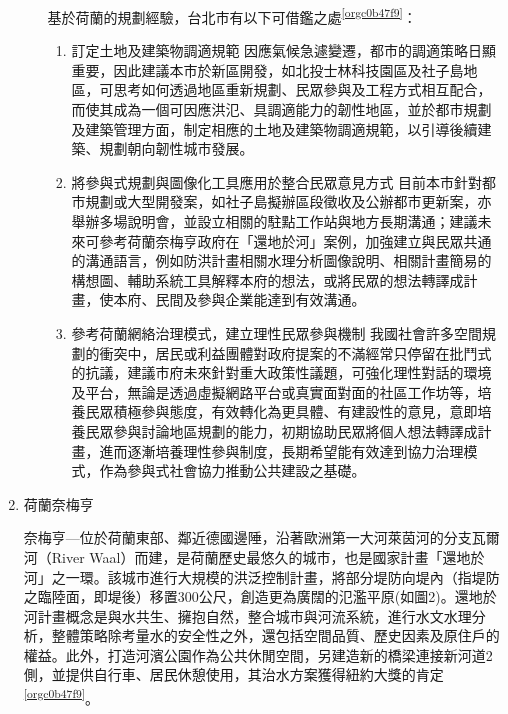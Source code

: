 \documentclass[a4paper,12pt]{article}
\begin{document}
\begin{enumerate}
\begin{enumerate}
基於荷蘭的規劃經驗，台北市有以下可借鑑之處\textsuperscript{\ref{orgc0b47f9}}：\\
\begin{enumerate}
\item 訂定土地及建築物調適規範   因應氣候急遽變遷，都市的調適策略日顯重要，因此建議本市於新區開發，如北投士林科技園區及社子島地區，可思考如何透過地區重新規劃、民眾參與及工程方式相互配合，而使其成為一個可因應洪氾、具調適能力的韌性地區，並於都市規劃及建築管理方面，制定相應的土地及建築物調適規範，以引導後續建築、規劃朝向韌性城市發展。\\
\item 將參與式規劃與圖像化工具應用於整合民眾意見方式   目前本市針對都市規劃或大型開發案，如社子島擬辦區段徵收及公辦都市更新案，亦舉辦多場說明會，並設立相關的駐點工作站與地方長期溝通；建議未來可參考荷蘭奈梅亨政府在「還地於河」案例，加強建立與民眾共通的溝通語言，例如防洪計畫相關水理分析圖像說明、相關計畫簡易的構想圖、輔助系統工具解釋本府的想法，或將民眾的想法轉譯成計畫，使本府、民間及參與企業能達到有效溝通。\\
\item 參考荷蘭網絡治理模式，建立理性民眾參與機制   我國社會許多空間規劃的衝突中，居民或利益團體對政府提案的不滿經常只停留在批鬥式的抗議，建議市府未來針對重大政策性議題，可強化理性對話的環境及平台，無論是透過虛擬網路平台或真實面對面的社區工作坊等，培養民眾積極參與態度，有效轉化為更具體、有建設性的意見，意即培養民眾參與討論地區規劃的能力，初期協助民眾將個人想法轉譯成計畫，進而逐漸培養理性參與制度，長期希望能有效達到協力治理模式，作為參與式社會協力推動公共建設之基礎。\\
\end{enumerate}
\end{enumerate}

\item 荷蘭奈梅亨
\label{sec:org1ce5fc5}

奈梅亨—位於荷蘭東部、鄰近德國邊陲，沿著歐洲第一大河萊茵河的分支瓦爾河（River Waal）而建，是荷蘭歷史最悠久的城市，也是國家計畫「還地於河」之一環。該城市進行大規模的洪泛控制計畫，將部分堤防向堤內（指堤防之臨陸面，即堤後）移置300公尺，創造更為廣闊的氾濫平原(如圖2)。還地於河計畫概念是與水共生、擁抱自然，整合城市與河流系統，進行水文水理分析，整體策略除考量水的安全性之外，還包括空間品質、歷史因素及原住戶的權益。此外，打造河濱公園作為公共休閒空間，另建造新的橋梁連接新河道2側，並提供自行車、居民休憩使用，其治水方案獲得紐約大獎的肯定\textsuperscript{\ref{orgc0b47f9}}。\\


\end{enumerate}
\end{document}
